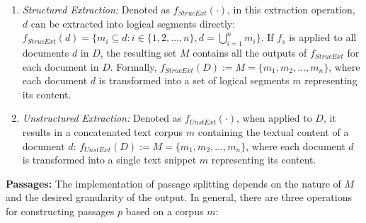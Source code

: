 \begin{enumerate}
    \item \textit{Structured Extraction:} Denoted as $f_{StrucExt}(\cdot)$, in this extraction operation, $d$ can be extracted into logical segments directly: $f_{StrucExt}(d) = \{m_i \subseteq d : i \in \{1, 2, \ldots, n\}, d = \bigcup_{i=1}^{n} m_i\}$. If $f_s$ is applied to all documents $d$ in $D$, the resulting set $M$ contains all the outputs of $f_{StrucExt}$ for each document in $D$. Formally, $f_{StrucExt}(D) := M = \{m_1, m_2, \dots, m_n\}$, where each document $d$ is transformed into a set of logical segments $m$ representing its content.
    \item \textit{Unstructured Extraction:} Denoted as $f_{UnstExt}(\cdot)$, when applied to $D$, it results in a concatenated text corpus $m$ containing the textual content of a document $d$: $f_{UnstExt}(D) := M = \{m_1, m_2, \dots, m_n\}$, where each document $d$ is transformed into a single text snippet $m$ representing its content.
\end{enumerate}

\vspace{\baselineskip} %

\noindent\textbf{Passages:} The implementation of passage splitting depends on the nature of $M$ and the desired granularity of the output. In general, there are three operations for constructing passages $p$ based on a corpus $m$:

